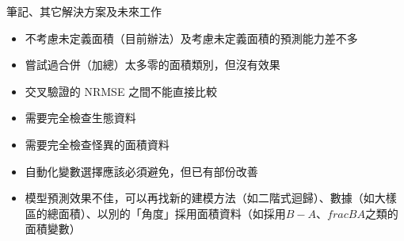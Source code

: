 \documentclass[10pt, aspectratio=1610, xcolor=table]{beamer}
\begin{document}
%

\begin{frame}{筆記、其它解決方案及未來工作}
\begin{itemize}
	\item 不考慮未定義面積（目前辦法）及考慮未定義面積的預測能力差不多
	\item 嘗試過合併（加總）太多零的面積類別，但沒有效果
	\item 交叉驗證的 NRMSE 之間不能直接比較
	\item 需要完全檢查生態資料
	\item 需要完全檢查怪異的面積資料
	\item 自動化變數選擇應該必須避免，但已有部份改善
	\item 模型預測效果不佳，可以再找新的建模方法（如二階式迴歸）、數據（如大樣區的總面積）、以別的「角度」採用面積資料（如採用$B-A$、$frac{B}{A}$之類的面積變數）
\end{itemize}
\end{frame}
\end{document}
